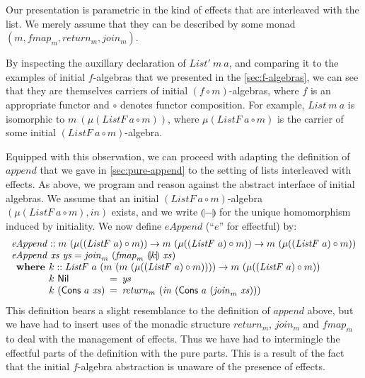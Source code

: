 \documentclass{jfp1}
\newcommand{\fold}[1]{\llparenthesis #1 \rrparenthesis}
\begin{document}
Our presentation is parametric in the kind of effects that
are interleaved with the list. We merely assume that they can be
described by some monad $(m, \mathit{fmap_m}, \mathit{return_m},
\mathit{join_m})$.

By inspecting the auxillary declaration of $\mathit{List'}~m~a$, and
comparing it to the examples of initial $f$-algebras that we presented
in the \autoref{sec:f-algebras}, we can see that they are themselves
carriers of initial $(f \circ m)$-algebras, where $f$ is an
appropriate functor and $\circ$ denotes functor composition. For
example, $\mathit{List}~m~a$ is isomorphic to $m~(\mu
(\mathit{ListF}~a \circ m))$, where $\mu (\mathit{ListF}~a \circ m)$
is the carrier of some initial $(\mathit{ListF}~a \circ m)$-algebra.

Equipped with this observation, we can proceed with adapting the
definition of $\mathit{append}$ that we gave in
\autoref{sec:pure-append} to the setting of lists interleaved with
effects. As above, we program and reason against the abstract
interface of initial algebras. We assume that an initial
$(\mathit{ListF}~a \circ m)$-algebra $(\mu(\mathit{ListF}~a \circ m),
\mathit{in})$ exists, and we write $\fold{-}$ for the unique
homomorphism induced by initiality. We now define $\mathit{eAppend}$
(``$\mathit{e}$'' for effectful) by:
\begin{displaymath}
  \begin{array}{l}
    \mathit{eAppend} :: m~(\mu ((\mathit{ListF}~a) \circ m)) \to m~(\mu ((\mathit{ListF}~a) \circ m)) \to m~(\mu ((\mathit{ListF}~a) \circ m)) \\
    \mathit{eAppend}~\mathit{xs}~\mathit{ys} = \mathit{join}_m~(\mathit{fmap}_m~\fold{k}~\mathit{xs}) \\
    \begin{array}{r@{\hspace{0.4em}}l}
      \textbf{where} & k :: \mathit{ListF}~a~(m~(m~(\mu ((\mathit{ListF}~a) \circ m)))) \to m~(\mu ((\mathit{ListF}~a) \circ m)) \\
                     &
                     \begin{array}{@{}l@{\hspace{0.5em}}c@{\hspace{0.5em}}l}
                       k~\mathsf{Nil} &=& \mathit{ys} \\
                       k~(\mathsf{Cons}~a~\mathit{xs}) &=& \mathit{return}_m~(\mathit{in}~(\mathsf{Cons}~a~(\mathit{join}_m~\mathit{xs})))
                     \end{array}
    \end{array}
  \end{array}
\end{displaymath}
This definition bears a slight resemblance to the definition of
$\mathit{append}$ above, but we have had to insert uses of the monadic
structure $\mathit{return_m}$, $\mathit{join_m}$ and $\mathit{fmap_m}$
to deal with the management of effects. Thus we have had to
intermingle the effectful parts of the definition with the pure
parts. This is a result of the fact that the initial $f$-algebra
abstraction is unaware of the presence of effects.
\end{document}

